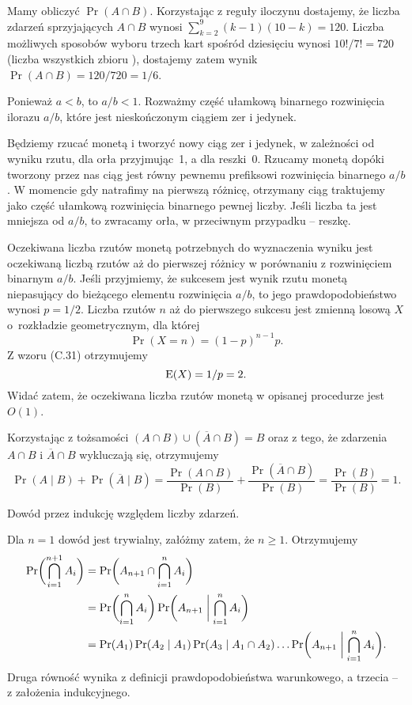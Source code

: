Mamy obliczyć $\Pr(A\cap B)$. Korzystając z reguły iloczynu dostajemy, że liczba zdarzeń sprzyjających $A\cap B$ wynosi $\sum_{k=2}^9(k-1)(10-k)=120$. Liczba możliwych sposobów wyboru trzech kart spośród dziesięciu wynosi $10!/7!=720$ (liczba wszystkich  zbioru ), dostajemy zatem wynik $\Pr(A\cap B)=120/720=1/6$.

\exercise{} %
\noindent Ponieważ $a<b$, to $a/b<1$. Rozważmy część ułamkową binarnego rozwinięcia ilorazu $a/b$, które jest nieskończonym ciągiem zer i jedynek.

Będziemy rzucać monetą i tworzyć nowy ciąg zer i jedynek, w zależności od wyniku rzutu, dla orła przyjmując~1, a dla reszki~0. Rzucamy monetą dopóki tworzony przez nas ciąg jest równy pewnemu prefiksowi rozwinięcia binarnego $a/b$. W momencie gdy natrafimy na pierwszą różnicę, otrzymany ciąg traktujemy jako część ułamkową rozwinięcia binarnego pewnej liczby. Jeśli liczba ta jest mniejsza od $a/b$, to zwracamy orła, w przeciwnym przypadku -- reszkę.

Oczekiwana liczba rzutów monetą potrzebnych do wyznaczenia wyniku jest oczekiwaną liczbą rzutów aż do pierwszej różnicy w porównaniu z rozwinięciem binarnym $a/b$. Jeśli przyjmiemy, że sukcesem jest wynik rzutu monetą niepasujący do bieżącego elementu rozwinięcia $a/b$, to jego prawdopodobieństwo wynosi $p=1/2$. Liczba rzutów $n$ aż do pierwszego sukcesu jest zmienną losową $X$ o~rozkładzie geometrycznym, dla której
\[
	\Pr(X=n) = (1-p)^{n-1}p.
\]
Z wzoru (C.31) otrzymujemy
\[
	\operatorname{E}(X) = 1/p = 2.
\]
Widać zatem, że oczekiwana liczba rzutów monetą w opisanej procedurze jest $O(1)$.

\exercise{} %
\noindent Korzystając z tożsamości $(A\cap B)\cup(\overline{A}\cap B)=B$ oraz z tego, że zdarzenia $A\cap B$ i $\overline{A}\cap B$ wykluczają się, otrzymujemy
\[
	\Pr(A\mid B)+\Pr(\overline{A}\mid B) = \frac{\Pr(A\cap B)}{\Pr(B)}+\frac{\Pr(\overline{A}\cap B)}{\Pr(B)} = \frac{\Pr(B)}{\Pr(B)} = 1.
\]

\exercise{} %
\noindent Dowód przez indukcję względem liczby zdarzeń.

Dla $n=1$ dowód jest trywialny, załóżmy zatem, że $n\ge1$. Otrzymujemy
\begin{align*}
	\Pr\biggl(\bigcap_{i=1}^{n+1}A_i\biggr) &= \Pr\biggl(A_{n+1}\cap\bigcap_{i=1}^nA_i\biggr) \\
	&= \Pr\biggl(\bigcap_{i=1}^nA_i\biggr)\Pr\biggl(A_{n+1}\biggm|\bigcap_{i=1}^nA_i\biggr) \\
	&= \Pr(A_1)\Pr(A_2\mid A_1)\Pr(A_3\mid A_1\cap A_2)\dots\Pr\biggl(A_{n+1}\biggm|\bigcap_{i=1}^nA_i\biggr).
\end{align*}
Druga równość wynika z definicji prawdopodobieństwa warunkowego, a trzecia -- z założenia indukcyjnego.

